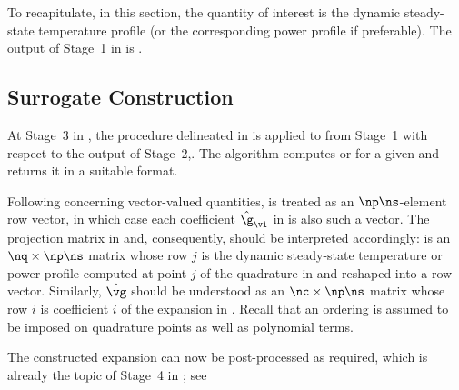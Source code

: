 To recapitulate, in this section, the quantity of interest \g is the dynamic
steady-state temperature profile \mq (or the corresponding power profile \mp if
preferable). The output of Stage~1 in  is
.

\subsection{Surrogate Construction}

At Stage~3 in , the procedure delineated in
 is applied to
 from Stage~1 with respect to the
output of Stage~2,. The algorithm computes \mp or \mq for a given \vu and
returns it in a suitable format.

Following  concerning vector-valued
quantities, \g is treated as an $\np \ns$-element row vector, in which case each
coefficient $\hat{\g}_{\vi}$ in  is also such a vector.
The projection matrix in  and, consequently,
 should be interpreted accordingly: \vg is an $\nq
\times \np \ns$ matrix whose row $j$ is the dynamic steady-state temperature or
power profile computed at point $j$ of the quadrature in
 and reshaped into a row vector. Similarly, $\hat{\vg}$
should be understood as an $\nc \times \np \ns$ matrix whose row $i$ is
coefficient $i$ of the expansion in . Recall that an
ordering is assumed to be imposed on quadrature points as well as polynomial
terms.

The constructed expansion can now be post-processed as required, which is
already the topic of Stage~4 in ; see
